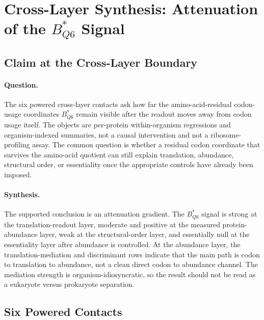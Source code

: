 \section{Cross-Layer Synthesis: Attenuation of the $B^*_{Q6}$ Signal}

\subsection{Claim at the Cross-Layer Boundary}

\paragraph{Question.}
The six powered cross-layer contacts ask how far the amino-acid-residual codon-usage coordinates $B^*_{Q6}$ remain visible after the readout moves away from codon usage itself.  The objects are per-protein within-organism regressions and organism-indexed summaries, not a causal intervention and not a ribosome-profiling assay.  The common question is whether a residual codon coordinate that survives the amino-acid quotient can still explain translation, abundance, structural order, or essentiality once the appropriate controls have already been imposed.

\paragraph{Synthesis.}
The supported conclusion is an attenuation gradient.  The $B^*_{Q6}$ signal is strong at the translation-readout layer, moderate and positive at the measured protein-abundance layer, weak at the structural-order layer, and essentially null at the essentiality layer after abundance is controlled.  At the abundance layer, the translation-mediation and discriminant rows indicate that the main path is codon to translation to abundance, not a clean direct codon to abundance channel.  The mediation strength is organism-idiosyncratic, so the result should not be read as a eukaryote versus prokaryote separation.

\subsection{Six Powered Contacts}

